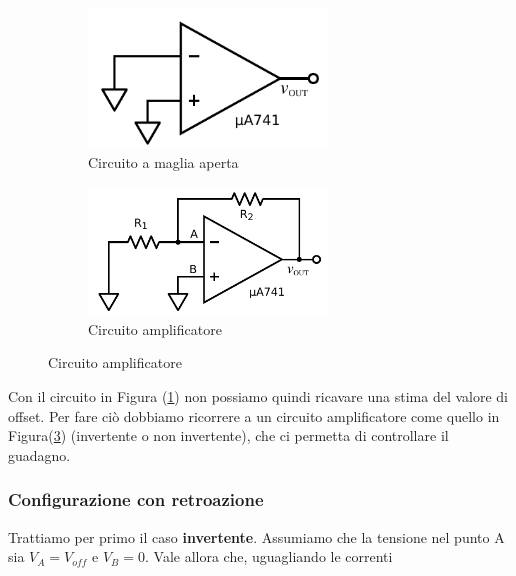 \begin{figure}[ht]
        \centering
        \begin{subfigure}[b]{0.35\textwidth}
                 \includegraphics[width=0.70\textwidth]{../E02/latex/open_loop.pdf}
                \caption{Circuito a maglia aperta}
                \label{cir:open_loop}
        \end{subfigure}%
    \quad
        \begin{subfigure}[b]{0.35\textwidth}
               \includegraphics[width=0.70\textwidth]{../E02/latex/inv.pdf}
                \caption{Circuito amplificatore}
                \label{cir:inv}
        \end{subfigure}
     
\end{figure}

Con il circuito in Figura (\ref{cir:open_loop}) non possiamo quindi ricavare una stima del valore di offset. Per fare ciò dobbiamo ricorrere a un circuito amplificatore come quello in Figura(\ref{cir:inv}) (invertente o non invertente), che ci permetta di controllare il guadagno.

\subsubsection{Configurazione con retroazione}

Trattiamo per primo il caso \textbf{invertente}. Assumiamo che la tensione nel punto A sia $V_A=V_{off}$ e $V_B=0$. Vale allora che, uguagliando le correnti

